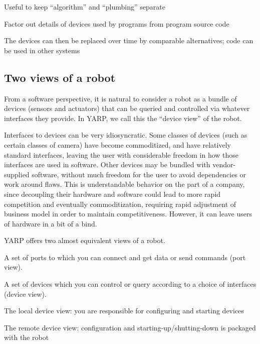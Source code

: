 Useful to keep ``algorithm'' and ``plumbing'' separate

Factor out details of devices used by programs from program source code

The devices can then be replaced over time by comparable alternatives;
code can be used in other systems




\subsection{Two views of a robot}

From a software perspective, it is natural to consider a robot
as a bundle of devices (sensors and actuators) that can be
queried and controlled via whatever interfaces they provide.
In YARP, we call this the ``device view'' of the robot.

Interfaces to devices can be very idiosyncratic.  Some
classes of devices (such as certain classes of camera) have become
commoditized, and have relatively standard interfaces, leaving the
user with considerable freedom in how those interfaces are used in
software.  Other devices may be bundled with vendor-supplied software,
without much freedom for the user to avoid dependencies or work around
flaws.  This is understandable behavior on the part of a company,
since decoupling their hardware and software could lead to more rapid
competition and eventually commoditization, requiring rapid adjustment
of business model in order to maintain competitiveness.  However,
it can leave users of hardware in a bit of a bind.


YARP offers two almost equivalent views of a robot.


A set of ports to which you can connect and get data or send commands
(port view).

A set of devices which you can control or query according to a choice
of interfaces (device view).

The local device view: you are responsible for configuring and starting devices

The remote device view: configuration and starting-up/shutting-down is
packaged with the robot

